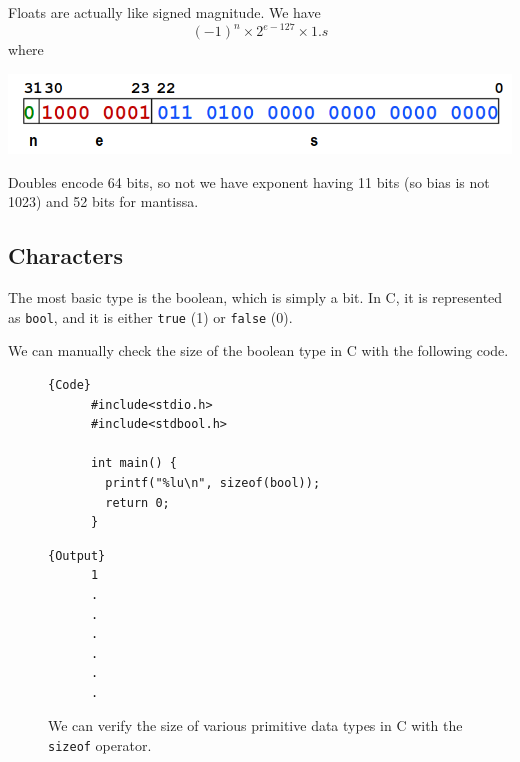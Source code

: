   \begin{theorem}
    Floats are actually like signed magnitude. We have 
    \begin{equation} 
      (-1)^n \times 2^{e - 127} \times 1.s
    \end{equation}
    where 
    \begin{center} 
      \includegraphics[scale=0.5]{img/float_encoding.png}
    \end{center}
    Doubles encode 64 bits, so not we have exponent having 11 bits (so bias is not 1023) and 52 bits for mantissa. 
  \end{theorem}

\subsection{Characters}

  \begin{definition}[Booleans in C]
    The most basic type is the boolean, which is simply a bit. In C, it is represented as \texttt{bool}, and it is either \texttt{true} (1) or \texttt{false} (0). 
  \end{definition}

  We can manually check the size of the boolean type in C with the following code. 

  \begin{figure}[H]
    \centering 
    \noindent\begin{minipage}{.5\textwidth}
    \begin{lstlisting}[firstnumber=1]{Code}
      #include<stdio.h>
      #include<stdbool.h>

      int main() {
        printf("%lu\n", sizeof(bool)); 
        return 0; 
      }
    \end{lstlisting}
    \end{minipage}
    \hfill
    \begin{minipage}{.49\textwidth}
    \begin{lstlisting}[]{Output}
      1
      .
      .
      .
      .
      .
      .
    \end{lstlisting}
    \end{minipage}
    \caption{We can verify the size of various primitive data types in C with the \texttt{sizeof} operator.} 
    \label{fig:boolean_size}
  \end{figure}


